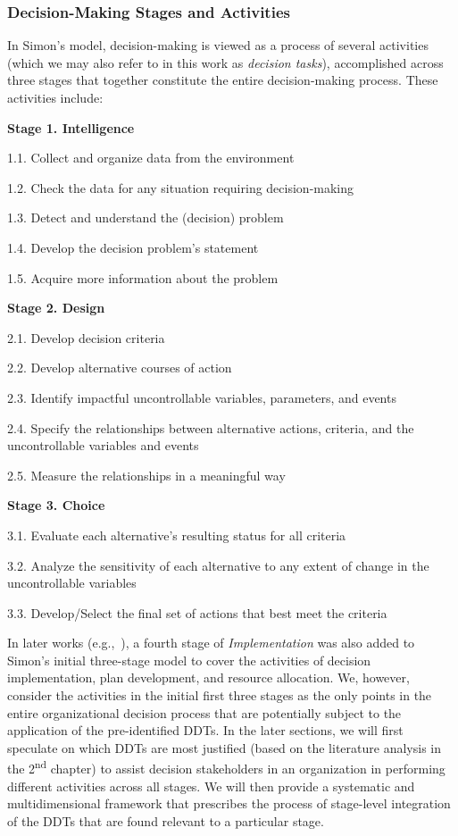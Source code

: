 \documentclass{sfuthesis}
\begin{document}
\subsubsection{Decision-Making Stages and Activities}
In Simon’s model, decision-making is viewed as a process of several activities (which we may also refer to in this work as \textit{decision tasks}), accomplished across three stages that together constitute the entire decision-making process. These activities include:\par
\textbf{Stage 1. Intelligence}\par
1.1. Collect and organize data from the environment\par
1.2. Check the data for any situation requiring decision-making\par
1.3. Detect and understand the (decision) problem\par
1.4. Develop the decision problem’s statement ~\cite{phillips2013intelligent}\par
1.5. Acquire more information about the problem ~\cite{phillips2013intelligent}\par
\textbf{Stage 2. Design}\par
2.1. Develop decision criteria ~\cite{phillips2013intelligent}\par
2.2. Develop alternative courses of action ~\cite{phillips2013intelligent}\par
2.3. Identify impactful uncontrollable variables, parameters, and events ~\cite{phillips2013intelligent}\par
2.4. Specify the relationships between alternative actions, criteria, and the uncontrollable variables and events ~\cite{phillips2013intelligent}\par
2.5. Measure the relationships in a meaningful way ~\cite{phillips2013intelligent}\par
\textbf{Stage 3. Choice}\par
3.1. Evaluate each alternative’s resulting status for all criteria
~\cite{phillips2013intelligent}\par
3.2. Analyze the sensitivity of each alternative to any extent of change in the uncontrollable variables\par
3.3. Develop/Select the final set of actions that best meet the criteria
~\cite{phillips2013intelligent}\par
In later works (e.g.,~\cite{mintzberg1977new}), a fourth stage of \textit{Implementation} was also added to Simon’s initial three-stage model to cover the activities of decision implementation, plan development, and resource allocation. We, however, consider the activities in the initial first three stages as the only points in the entire organizational decision process that are potentially subject to the application of the pre-identified DDTs. In the later sections, we will first speculate on which DDTs are most justified (based on the literature analysis in the 2\textsuperscript{nd} chapter) to assist decision stakeholders in an organization in performing different activities across all stages. We will then provide a systematic and multidimensional framework that prescribes the process of stage-level integration of the DDTs that are found relevant to a particular stage.\par
\end{document}

